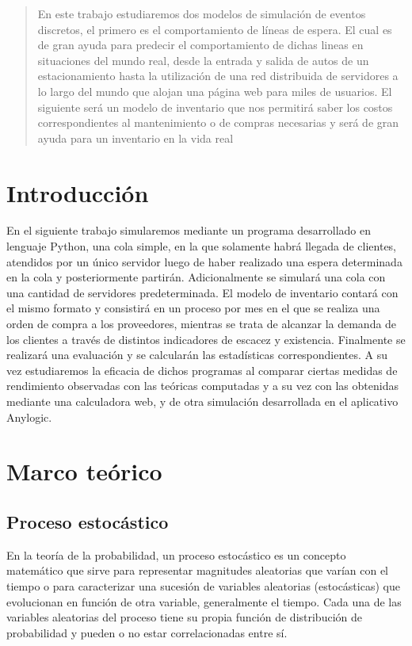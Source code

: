 \nocite{*} %
\begin{abstract}
  En este trabajo estudiaremos dos modelos de simulación de eventos discretos, el primero es el comportamiento
  de líneas de espera. El cual es de gran ayuda para predecir el comportamiento de dichas lineas en
  situaciones del mundo real, desde la entrada y salida de autos de un estacionamiento hasta la utilización
  de una red distribuida de servidores a lo largo del mundo que alojan una página web para miles de usuarios.
  El siguiente será un modelo de inventario que nos permitirá saber los costos correspondientes al mantenimiento
  o de compras necesarias y será de gran ayuda para un inventario en la vida real
\end{abstract}


\section{Introducción}\label{sec:introduccion}
En el siguiente trabajo simularemos mediante un programa desarrollado en lenguaje Python, una cola simple, en la que
solamente habrá llegada de clientes, atendidos por un único servidor luego de haber realizado una espera
determinada en la cola y posteriormente partirán.
Adicionalmente se simulará una cola con una cantidad de servidores predeterminada.
El modelo de inventario contará con el mismo formato y consistirá en un proceso por mes en el que se realiza una orden de compra
a los proveedores, mientras se trata de alcanzar la demanda de los clientes a través de distintos indicadores de escacez y
existencia.
Finalmente se realizará una evaluación y se calcularán las estadísticas correspondientes.
A su vez estudiaremos la eficacia de dichos programas al comparar ciertas medidas de rendimiento observadas con las
teóricas computadas y a su vez con las obtenidas mediante una calculadora web, y de otra simulación desarrollada
en el aplicativo Anylogic.


\section{Marco teórico}\label{sec:marco-teórico}

\subsection{Proceso estocástico}\label{subsec:proceso-estocástico}
En la teoría de la probabilidad, un proceso estocástico es un concepto matemático que sirve para representar
magnitudes aleatorias que varían con el tiempo o para caracterizar una sucesión de variables aleatorias (estocásticas)
que evolucionan en función de otra variable, generalmente el tiempo.
Cada una de las variables aleatorias del proceso tiene su propia función de distribución de probabilidad y pueden o no
estar correlacionadas entre sí.

